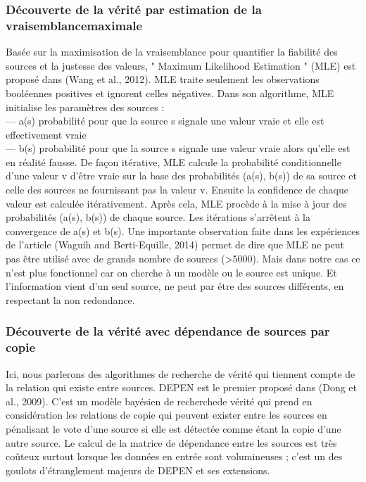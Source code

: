\documentclass[12pt]{report}
\begin{document}
\subsubsection{Découverte de la vérité par estimation de la vraisemblancemaximale}

Basée sur la maximisation de la vraisemblance pour quantifier la fiabilité
des sources et la justesse des valeurs, " Maximum Likelihood Estimation "
(MLE) est proposé dans (Wang et al., 2012). MLE traite seulement les
observations booléennes positives et ignorent celles négatives. Dans son
algorithme, MLE initialise les paramètres des sources :
\\— a(s) probabilité pour que la source s signale une valeur vraie et elle est
effectivement vraie
\\— b(s) probabilité pour que la source s signale une valeur vraie alors
qu’elle est en réalité fausse.
De façon itérative, MLE calcule la probabilité conditionnelle d’une valeur
v d’être vraie sur la base des probabilités (a(s), b(s)) de sa source et celle
des sources ne fournissant pas la valeur v. Ensuite la confidence de chaque
valeur est calculée itérativement. Après cela, MLE procède à la mise à jour
des probabilités (a(s), b(s)) de chaque source. Les itérations s’arrêtent à la
convergence de a(s) et b(s). Une importante observation faite dans les
expériences de l’article (Waguih and Berti-Equille, 2014) permet de dire
que MLE ne peut pas être utilisé avec de grands nombre de sources
(>5000).
Mais dans notre cas ce n’est plus fonctionnel car on cherche à un modèle
ou le source est unique. Et l’information vient d’un seul source, ne peut
par étre des sources différents, en respectant la non redondance\cite{50}.

\subsubsection{Découverte de la vérité avec dépendance de sources par copie}

Ici, nous parlerons des algorithmes de recherche de vérité qui tiennent
compte de la relation qui existe entre sources. DEPEN est le premier
proposé dans (Dong et al., 2009). C’est un modèle bayésien de recherchede vérité qui prend en considération les relations de copie qui peuvent
exister entre les sources en pénalisant le vote d’une source si elle est
détectée comme étant la copie d’une autre source. Le calcul de la matrice
de dépendance entre les sources est très coûteux surtout lorsque les
données en entrée sont volumineuses ; c’est un des goulots d’étranglement
majeurs de DEPEN et ses extensions\cite{51}.
\end{document}
